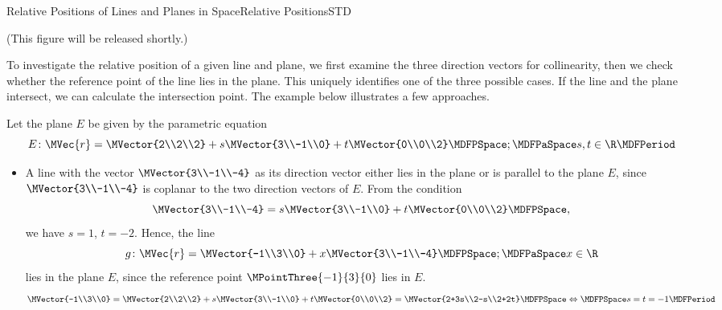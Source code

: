 \begin{MXContent}{Relative Positions of Lines and Planes in Space}{Relative Positions}{STD}
\begin{MInfo}
(This figure will be released shortly.)

\end{MInfo}

To investigate the relative position of a given line and plane, we first examine the 
three direction vectors for collinearity, then we check whether the reference point of the line 
lies in the plane. This uniquely identifies one of the three possible cases. If the line and 
the plane intersect, we can calculate the intersection point. The example below illustrates 
a few approaches. 

\begin{MExample}
Let the plane $E$ be given by the parametric equation
\[
 E\colon\MVec{r}=\MVector{2\\2\\2}+s\MVector{3\\-1\\0}+t\MVector{0\\0\\2}\MDFPSpace;\MDFPaSpace s,t\in\R \MDFPeriod
\]
\begin{itemize}
 \item A line with the vector $\MVector{3\\-1\\-4}$ as its direction vector either lies in the plane
  or is parallel to the plane $E$, since $\MVector{3\\-1\\-4}$ is coplanar to the two direction vectors of 
  $E$. From the condition 
 \[
  \MVector{3\\-1\\-4}=s\MVector{3\\-1\\0}+t\MVector{0\\0\\2}\MDFPSpace , 
 \]
  we have $s=1$, $t=-2$. Hence, the line
 \[
  g\colon\MVec{r}=\MVector{-1\\3\\0}+x\MVector{3\\-1\\-4}\MDFPSpace;\MDFPaSpace x\in\R
 \]
 lies in the plane $E$, since the reference point $\MPointThree{-1}{3}{0}$ lies in $E$.
 \[
  \MVector{-1\\3\\0}=\MVector{2\\2\\2}+s\MVector{3\\-1\\0}+t\MVector{0\\0\\2}=\MVector{2+3s\\2-s\\2+2t}\MDFPSpace\Leftrightarrow\MDFPSpace s=t=-1\MDFPeriod
\]
\end{itemize}
\end{MExample}
\end{MXContent}
